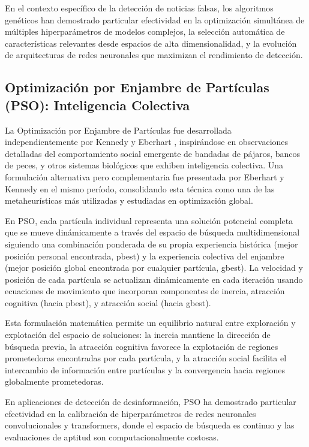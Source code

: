 En el contexto específico de la detección de noticias falsas, los algoritmos genéticos han demostrado particular efectividad en la optimización simultánea de múltiples hiperparámetros de modelos complejos, la selección automática de características relevantes desde espacios de alta dimensionalidad, y la evolución de arquitecturas de redes neuronales que maximizan el rendimiento de detección.

\subsection{Optimización por Enjambre de Partículas (PSO): Inteligencia Colectiva}

La Optimización por Enjambre de Partículas fue desarrollada independientemente por Kennedy y Eberhart \cite{kennedy1995particle}, inspirándose en observaciones detalladas del comportamiento social emergente de bandadas de pájaros, bancos de peces, y otros sistemas biológicos que exhiben inteligencia colectiva. Una formulación alternativa pero complementaria fue presentada por Eberhart y Kennedy \cite{eberhart1995particle} en el mismo período, consolidando esta técnica como una de las metaheurísticas más utilizadas y estudiadas en optimización global.

En PSO, cada partícula individual representa una solución potencial completa que se mueve dinámicamente a través del espacio de búsqueda multidimensional siguiendo una combinación ponderada de su propia experiencia histórica (mejor posición personal encontrada, pbest) y la experiencia colectiva del enjambre (mejor posición global encontrada por cualquier partícula, gbest). La velocidad y posición de cada partícula se actualizan dinámicamente en cada iteración usando ecuaciones de movimiento que incorporan componentes de inercia, atracción cognitiva (hacia pbest), y atracción social (hacia gbest).

Esta formulación matemática permite un equilibrio natural entre exploración y explotación del espacio de soluciones: la inercia mantiene la dirección de búsqueda previa, la atracción cognitiva favorece la explotación de regiones prometedoras encontradas por cada partícula, y la atracción social facilita el intercambio de información entre partículas y la convergencia hacia regiones globalmente prometedoras.

En aplicaciones de detección de desinformación, PSO ha demostrado particular efectividad en la calibración de hiperparámetros de redes neuronales convolucionales y transformers, donde el espacio de búsqueda es continuo y las evaluaciones de aptitud son computacionalmente costosas.

